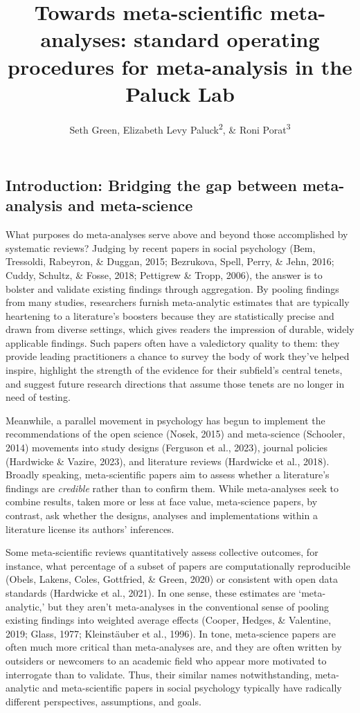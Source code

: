 \documentclass[
  man]{apa6}
\title{Towards meta-scientific meta-analyses: standard operating procedures for meta-analysis in the Paluck Lab}
\author{Seth Green\textsuperscript{}, Elizabeth Levy Paluck\textsuperscript{2}, \& Roni Porat\textsuperscript{3}}
\date{}
\affiliation{\vspace{0.5cm}\textsuperscript{1} Kahneman-Treisman Center, Princeton University\\\textsuperscript{2} Princeton University\\\textsuperscript{3} Hebrew University, Jerusalem}
\begin{document}
\maketitle

\subsection{Introduction: Bridging the gap between meta-analysis and meta-science}\label{introduction-bridging-the-gap-between-meta-analysis-and-meta-science}

What purposes do meta-analyses serve above and beyond those accomplished by systematic reviews? Judging by recent papers in social psychology (Bem, Tressoldi, Rabeyron, \& Duggan, 2015; Bezrukova, Spell, Perry, \& Jehn, 2016; Cuddy, Schultz, \& Fosse, 2018; Pettigrew \& Tropp, 2006), the answer is to bolster and validate existing findings through aggregation. By pooling findings from many studies, researchers furnish meta-analytic estimates that are typically heartening to a literature's boosters because they are statistically precise and drawn from diverse settings, which gives readers the impression of durable, widely applicable findings. Such papers often have a valedictory quality to them: they provide leading practitioners a chance to survey the body of work they've helped inspire, highlight the strength of the evidence for their subfield's central tenets, and suggest future research directions that assume those tenets are no longer in need of testing.

Meanwhile, a parallel movement in psychology has begun to implement the recommendations of the open science (Nosek, 2015) and meta-science (Schooler, 2014) movements into study designs (Ferguson et al., 2023), journal policies (Hardwicke \& Vazire, 2023), and literature reviews (Hardwicke et al., 2018). Broadly speaking, meta-scientific papers aim to assess whether a literature's findings are \emph{credible} rather than to confirm them. While meta-analyses seek to combine results, taken more or less at face value, meta-science papers, by contrast, ask whether the designs, analyses and implementations within a literature license its authors' inferences.

Some meta-scientific reviews quantitatively assess collective outcomes, for instance, what percentage of a subset of papers are computationally reproducible (Obels, Lakens, Coles, Gottfried, \& Green, 2020) or consistent with open data standards (Hardwicke et al., 2021). In one sense, these estimates are `meta-analytic,' but they aren't meta-analyses in the conventional sense of pooling existing findings into weighted average effects (Cooper, Hedges, \& Valentine, 2019; Glass, 1977; Kleinstäuber et al., 1996). In tone, meta-science papers are often much more critical than meta-analyses are, and they are often written by outsiders or newcomers to an academic field who appear more motivated to interrogate than to validate. Thus, their similar names notwithstanding, meta-analytic and meta-scientific papers in social psychology typically have radically different perspectives, assumptions, and goals.
\end{document}
